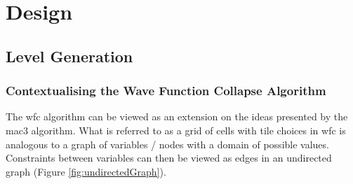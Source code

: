\chapter{Design}
\section{Level Generation}
\subsection{Contextualising the Wave Function Collapse Algorithm}
The \acrfull{wfc} algorithm can be viewed as an extension on the ideas presented by the \acrfull{mac3} algorithm. What is referred to as a grid of cells with tile choices in \acrlong{wfc} is analogous to a graph of variables / nodes with a domain of possible values. Constraints between variables can then be viewed as edges in an undirected graph (Figure \ref{fig:undirectedGraph}).


